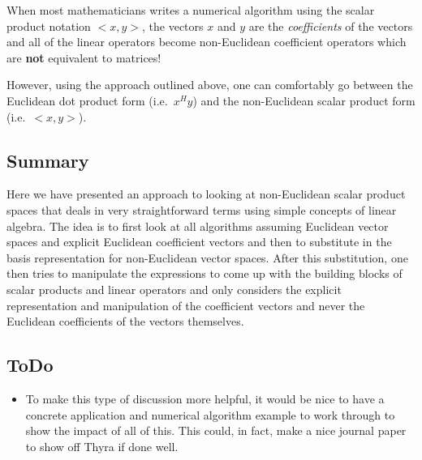 \begin{dumb_fact}
When most mathematicians writes a numerical algorithm using the scalar product
notation $<x,y>$, the vectors $x$ and $y$ are the {}\textit{coefficients} of
the vectors and all of the linear operators become non-Euclidean coefficient
operators which are {}\textbf{not} equivalent to matrices!
\end{dumb_fact}

However, using the approach outlined above, one can comfortably go between the
Euclidean dot product form (i.e.\ $x^H y$) and the non-Euclidean scalar
product form (i.e.\ $<x,y>$).

\subsection{Summary}

Here we have presented an approach to looking at non-Euclidean scalar product
spaces that deals in very straightforward terms using simple concepts of
linear algebra.  The idea is to first look at all algorithms assuming
Euclidean vector spaces and explicit Euclidean coefficient vectors and then to
substitute in the basis representation for non-Euclidean vector spaces.  After
this substitution, one then tries to manipulate the expressions to come up
with the building blocks of scalar products and linear operators and only
considers the explicit representation and manipulation of the coefficient
vectors and never the Euclidean coefficients of the vectors themselves.

\subsection{ToDo}

\begin{itemize}

{}\item To make this type of discussion more helpful, it would be nice to have
a concrete application and numerical algorithm example to work through to show
the impact of all of this.  This could, in fact, make a nice journal paper to
show off Thyra if done well.

\end{itemize}
